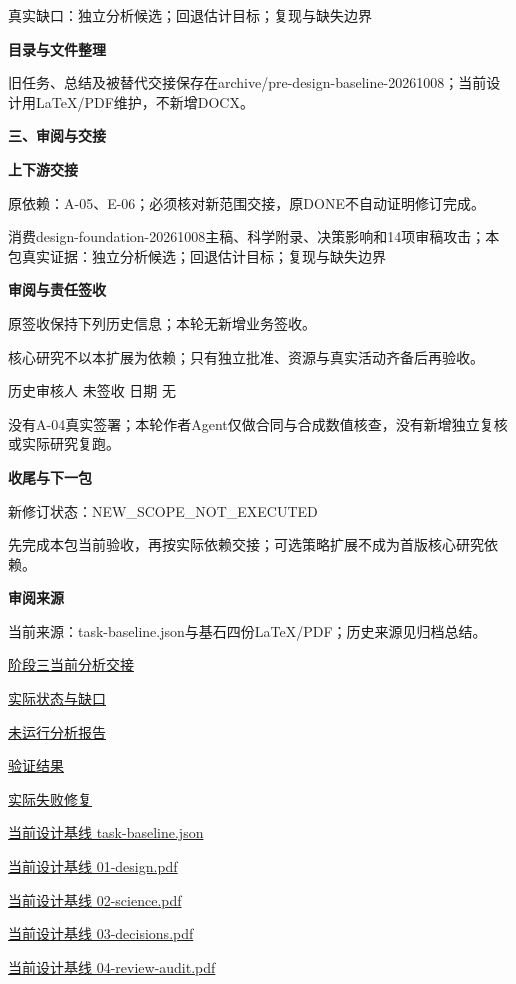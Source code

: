 \documentclass[11pt,a4paper]{article}
\newcommand{\reviewsection}[1]{\par\Needspace{5\baselineskip}\vspace{10pt}\begin{center}{\titlelatin\titlecjk\bfseries\fontsize{14}{20}\selectfont #1}\end{center}}
\newcommand{\reviewsubsection}[1]{\par\Needspace{4\baselineskip}\vspace{4pt}\begin{center}{\titlelatin\titlecjk\bfseries\fontsize{12}{18}\selectfont #1}\end{center}}
\begin{document}
真实缺口：独立分析候选；回退估计目标；复现与缺失边界


\reviewsubsection{2.4 目录与文件整理}
旧任务、总结及被替代交接保存在archive/\allowbreak{}pre-\allowbreak{}design-\allowbreak{}baseline-\allowbreak{}20261008；当前设计用LaTeX/\allowbreak{}PDF维护，不新增DOCX。


\reviewsection{三、审阅与交接}
\reviewsubsection{3.1 上下游交接}
原依赖：A-\allowbreak{}05、E-\allowbreak{}06；必须核对新范围交接，原DONE不自动证明修订完成。


消费design-\allowbreak{}foundation-\allowbreak{}20261008主稿、科学附录、决策影响和14项审稿攻击；本包真实证据：独立分析候选；回退估计目标；复现与缺失边界


\reviewsubsection{3.2 审阅与责任签收}
原签收保持下列历史信息；本轮无新增业务签收。


核心研究不以本扩展为依赖；只有独立批准、资源与真实活动齐备后再验收。


历史审核人 未签收    日期 无


没有A-\allowbreak{}04真实签署；本轮作者Agent仅做合同与合成数值核查，没有新增独立复核或实际研究复跑。


\reviewsubsection{3.3 收尾与下一包}
新修订状态：NEW\_\allowbreak{}SCOPE\_\allowbreak{}NOT\_\allowbreak{}EXECUTED


先完成本包当前验收，再按实际依赖交接；可选策略扩展不成为首版核心研究依赖。


\reviewsubsection{3.4 审阅来源}
当前来源：task-\allowbreak{}baseline.json与基石四份LaTeX/\allowbreak{}PDF；历史来源见归档总结。


\href{file:///D:/Agent/srp/agent/tasks/A-04/outputs/current-analysis.md}{阶段三当前分析交接}


\href{file:///D:/Agent/srp/agent/tasks/A-04/outputs/current-analysis.json}{实际状态与缺口}


\href{file:///D:/Agent/srp/agent/tasks/A-04/outputs/analysis-report-template.json}{未运行分析报告}


\href{file:///D:/Agent/srp/agent/tasks/A-04/evidence/verification.json}{验证结果}


\href{file:///D:/Agent/srp/agent/tasks/A-04/evidence/repair-notes.md}{实际失败修复}


\href{file:///D:/Agent/srp/agent/design/design-foundation-20261008/task-baseline.json}{当前设计基线 task-\allowbreak{}baseline.json}


\href{file:///D:/Agent/srp/agent/design/design-foundation-20261008/01-design.pdf}{当前设计基线 01-\allowbreak{}design.pdf}


\href{file:///D:/Agent/srp/agent/design/design-foundation-20261008/02-science.pdf}{当前设计基线 02-\allowbreak{}science.pdf}


\href{file:///D:/Agent/srp/agent/design/design-foundation-20261008/03-decisions.pdf}{当前设计基线 03-\allowbreak{}decisions.pdf}


\href{file:///D:/Agent/srp/agent/design/design-foundation-20261008/04-review-audit.pdf}{当前设计基线 04-\allowbreak{}review-\allowbreak{}audit.pdf}
\end{document}
